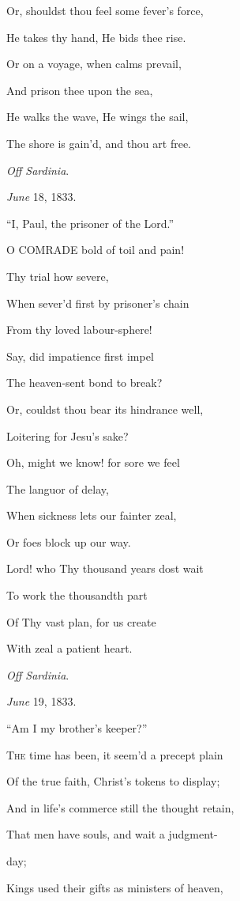 Or, shouldst thou feel some fever's force,

He takes thy hand, He bids thee rise.

Or on a voyage, when calms prevail,

And prison thee upon the sea,

He walks the wave, He wings the sail,

The shore is gain'd, and thou art free.

\emph{Off Sardinia}.

\emph{June} 18, 1833.


``I, Paul, the prisoner of the Lord.''

O COMRADE bold of toil and pain!

Thy trial how severe,

When sever'd first by prisoner's chain

From thy loved labour-sphere!

Say, did impatience first impel

The heaven-sent bond to break?

Or, couldst thou bear its hindrance well,

Loitering for Jesu's sake?

Oh, might we know! for sore we feel

The languor of delay,

When sickness lets our fainter zeal,

Or foes block up our way. 

Lord! who Thy thousand years dost wait

To work the thousandth part

Of Thy vast plan, for us create

With zeal a patient heart.

\emph{Off Sardinia}.

\emph{June} 19, 1833.


``Am I my brother's keeper?''

T\textsc{he} time has been, it seem'd a precept plain

Of the true faith, Christ's tokens to display;

And in life's commerce still the thought retain,

That men have souls, and wait a judgment-

day;

Kings used their gifts as ministers of heaven,

